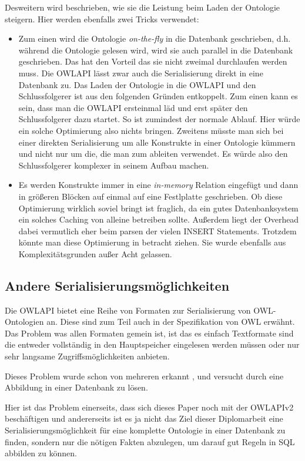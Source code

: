 Desweitern wird beschrieben, wie sie die Leistung beim Laden der Ontologie steigern. Hier werden ebenfalls zwei Tricks verwendet:
\begin{itemize}
  \item Zum einen wird die Ontologie \emph{on-the-fly} in die Datenbank geschrieben, d.h. während die Ontologie gelesen wird, wird sie auch parallel in die Datenbank geschrieben. Das hat den Vorteil das sie nicht zweimal durchlaufen werden muss. Die OWLAPI lässt zwar auch die Serialisierung direkt in eine Datenbank zu. Das Laden der Ontologie in die OWLAPI und den Schlussfolgerer ist aus den folgenden Gründen entkoppelt. Zum einen kann es sein, dass man die OWLAPI ersteinmal läd und erst später den Schlussfolgerer dazu startet. So ist zumindest der normale Ablauf. Hier würde ein solche Optimierung also nichts bringen. Zweitens müsste man sich bei einer direkten Serialisierung um alle Konstrukte in einer Ontologie kümmern und nicht nur um die, die man zum ableiten verwendet. Es würde also den Schlussfolgerer komplexer in seinem Aufbau machen.
  \item Es werden Konstrukte immer in eine \emph{in-memory} Relation eingefügt und dann in größeren Blöcken auf einmal auf eine Festlplatte geschrieben. Ob diese Optimierung wirklich soviel bringt ist fraglich, da ein gutes Datenbanksystem ein solches Caching von alleine betreiben sollte. Außerdem liegt der Overhead dabei vermutlich eher beim parsen der vielen INSERT Statements. Trotzdem könnte man diese Optimierung in betracht ziehen. Sie wurde ebenfalls aus Komplexitätsgrunden außer Acht gelassen.
\end{itemize}

\subsection{Andere Serialisierungsmöglichkeiten}
Die OWLAPI bietet eine Reihe von Formaten zur Serialisierung von OWL-Ontologien an. Diese sind zum Teil auch in der Spezifikation von OWL erwähnt. Das Problem was allen Formaten gemein ist, ist das es einfach Textformate sind die entweder vollständig in den Hauptspeicher eingelesen werden müssen oder nur sehr langsame Zugriffsmöglichkeiten anbieten.

Dieses Problem wurde schon von mehreren erkannt \cite{Kleb2009ProtegeDB}, \cite{Kleb2009OWLDB} und versucht durch eine Abbildung in einer Datenbank zu lösen.

Hier ist das Problem einerseits, dass sich dieses Paper noch mit der OWLAPIv2 beschäftigen und andererseits ist es ja nicht das Ziel dieser Diplomarbeit  eine Serialisierungsmöglichkeit für eine komplette Ontologie in einer Datenbank zu finden, sondern nur die nötigen Fakten abzulegen, um darauf gut Regeln in SQL abbilden zu können.